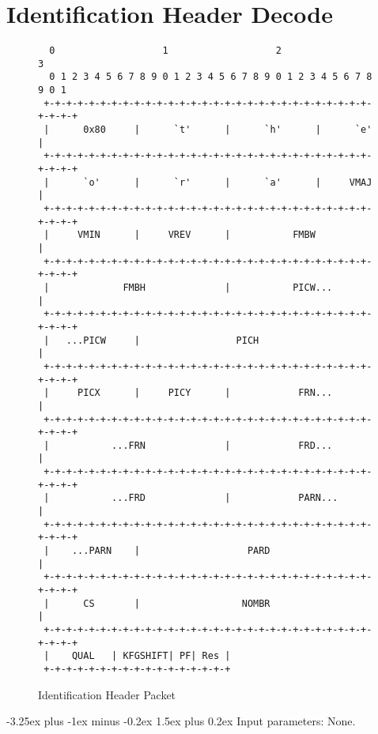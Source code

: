 \documentclass[9pt,letterpaper]{book}
\makeatletter
\numberwithin{equation}{chapter}
\numberwithin{figure}{chapter}
\numberwithin{table}{chapter}
\renewcommand{\paragraph}{\@startsection{paragraph}{4}{0ex}%
 {-3.25ex plus -1ex minus -0.2ex}%
 {1.5ex plus 0.2ex}%
 {\normalfont\normalsize\bfseries}}
\makeatother
\begin{document}
\section{Identification Header Decode}
\label{sec:idheader}

\begin{figure}[Htbp]
\begin{center}
\begin{verbatim}
  0                   1                   2                   3   
  0 1 2 3 4 5 6 7 8 9 0 1 2 3 4 5 6 7 8 9 0 1 2 3 4 5 6 7 8 9 0 1 
 +-+-+-+-+-+-+-+-+-+-+-+-+-+-+-+-+-+-+-+-+-+-+-+-+-+-+-+-+-+-+-+-+
 |      0x80     |      `t'      |      `h'      |      `e'      |
 +-+-+-+-+-+-+-+-+-+-+-+-+-+-+-+-+-+-+-+-+-+-+-+-+-+-+-+-+-+-+-+-+
 |      `o'      |      `r'      |      `a'      |     VMAJ      |
 +-+-+-+-+-+-+-+-+-+-+-+-+-+-+-+-+-+-+-+-+-+-+-+-+-+-+-+-+-+-+-+-+
 |     VMIN      |     VREV      |           FMBW                |
 +-+-+-+-+-+-+-+-+-+-+-+-+-+-+-+-+-+-+-+-+-+-+-+-+-+-+-+-+-+-+-+-+
 |             FMBH              |           PICW...             |
 +-+-+-+-+-+-+-+-+-+-+-+-+-+-+-+-+-+-+-+-+-+-+-+-+-+-+-+-+-+-+-+-+
 |   ...PICW     |                 PICH                          |
 +-+-+-+-+-+-+-+-+-+-+-+-+-+-+-+-+-+-+-+-+-+-+-+-+-+-+-+-+-+-+-+-+
 |     PICX      |     PICY      |            FRN...             |
 +-+-+-+-+-+-+-+-+-+-+-+-+-+-+-+-+-+-+-+-+-+-+-+-+-+-+-+-+-+-+-+-+
 |           ...FRN              |            FRD...             |
 +-+-+-+-+-+-+-+-+-+-+-+-+-+-+-+-+-+-+-+-+-+-+-+-+-+-+-+-+-+-+-+-+
 |           ...FRD              |            PARN...            |
 +-+-+-+-+-+-+-+-+-+-+-+-+-+-+-+-+-+-+-+-+-+-+-+-+-+-+-+-+-+-+-+-+
 |    ...PARN    |                   PARD                        |
 +-+-+-+-+-+-+-+-+-+-+-+-+-+-+-+-+-+-+-+-+-+-+-+-+-+-+-+-+-+-+-+-+
 |      CS       |                  NOMBR                        |
 +-+-+-+-+-+-+-+-+-+-+-+-+-+-+-+-+-+-+-+-+-+-+-+-+-+-+-+-+-+-+-+-+
 |    QUAL   | KFGSHIFT| PF| Res |
 +-+-+-+-+-+-+-+-+-+-+-+-+-+-+-+-+
\end{verbatim}
\end{center}
\caption{Identification Header Packet}
\label{fig:idheader}
\end{figure}

\paragraph{Input parameters:} None.
\end{document}
